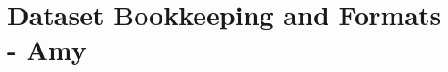 \section{Dataset Bookkeeping and Formats - Amy}
\begin{comment}
S. V. Chekanov, G. Gavalian, and N. A. Graf, “Jas4pp - a Data-Analysis Framework for Physics and Detector Studies”, arXiv:2011.05329 [physics.comp-ph ]] (pdf).
 - Java-based programs make distribution and installation on Windows, Linux, Mac easy
 - They mention excellent library support but it's not clear what libraries?
 - based on JAIDA, the Java implementation of AIDA (Abstract Interfaces for Data Analysis)
 - supports  LCIO [21] I/O library developed for ILC studies. Some examples of reading LCIO files using Jython code can be found in Appendix A.2 (and in the following sections).
 - HiPO (High Performance Output data, from JLAB, has an XROOTD driver)
 - ProMC, ProIO
 - stores outputs with Java serialization method, can be binary format or XML 
 
Jim Pivarski, Eduardo Rodrigues, Kevin Pedro, Oksana Shadura, Benjamin Krikler, Graeme A. Stewart. ”HL-LHC Computing Review Stage 2, Common Software Projects: Data Science Tools for Analysis”, arXiv:2202.02194 [physics.data-an] (pdf).
- physicists are motivated to contribute
- interoperability is key to supporting scientists
- ROOT is the columnar data store that will always be with us.  But ROOT files might some day contain more than TTrees, in particular RNTuple is under active development
- Apache Arrow, Apache Parquet now offer similary-efficient columnar storage and tese format are used by some collaborations
- Why not databases, this is an obvious match to our access problems!  See Striped, ServiceX, SkyhookDM, Coffea's columnservice, Tiled

J. V. Bennett, J. Guilliams, M. Hernandez Villanueva, D. E. Jaffe, P. J. Laycock, A. Panta, C. Serfon, I. Ueda. ”Belle II grid-based user analysis”, arXiv:2203.07564 [hep-ex] (pdf).
- ROOT files for storage and analysis
- about 60 PB needed for all data (skimmed and simulation, not saving "original" data?)
- collaboration feels that this is feasible storage-wise (although large) but that 10^12 events represents a data management challenge
  -- Using Rucio for job submission and file resolution
  -- Concerns about scalability
- central question is: how do we fund what's needed for analysis after the experiment?
  -- storage, computing, and networking services all cost money.  In particular, grid solutions require security upkeep and therefore may not be feasible long-term
  -- software must remain usable (perhaps through containers)
  -- float the idea of central facilities that provide needed services to experiments


\end{comment}
